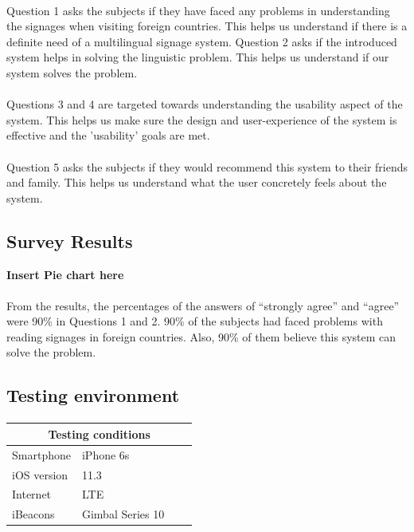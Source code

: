 \documentclass[12pt]{article}
\begin{document}
\paragraph{} Question 1 asks the subjects if they have faced any problems in understanding the signages when visiting foreign countries. This helps us understand if there is a definite need of a multilingual signage system. Question 2 asks if the introduced system helps in solving the linguistic problem. This helps us understand if our system solves the problem.

\paragraph{}Questions 3 and 4 are targeted towards understanding the usability aspect of the system. This helps us make sure the design and user-experience of the system is effective and the 'usability'  goals are met. 

\paragraph{}Question 5 asks the subjects if they would recommend this system to their friends and family. This helps us understand what the user concretely feels about the system.

\subsection{Survey Results}

\textbf{Insert Pie chart here}

\paragraph{}From the results, the percentages of the answers of “strongly agree” and “agree” were 90\% in Questions 1 and 2. 90\% of the subjects had faced problems with reading signages in foreign countries. Also, 90\% of them believe this system can solve the problem.



\subsection{Testing environment}
\paragraph{}

\begin{tabular}{ |p{6cm}||p{6cm}|p{3cm}|p{3cm}|  }
 \hline
 \multicolumn{4}{|c|}{Testing conditions} \\
 \hline
 Smartphone   & iPhone 6s  \\
  iOS version &11.3 \\
 Internet &   LTE \\
  iBeacons &   Gimbal  Series 10 \\
 
 \hline
\end{tabular}
\end{document}
